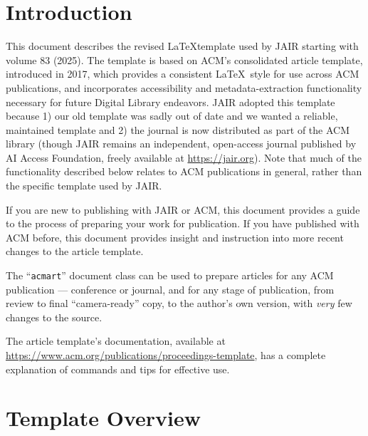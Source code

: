 \documentclass[manuscript, screen, review]{jair}
\begin{document}



\maketitle

\section{Introduction}
This document describes the revised \LaTeX template used by JAIR starting with volume 83 (2025). The template is based on ACM's consolidated article template, introduced in 2017, which provides a
consistent \LaTeX\ style for use across ACM publications, and
incorporates accessibility and metadata-extraction functionality
necessary for future Digital Library endeavors. JAIR adopted this template because 1) our old template was sadly out of date and we wanted a reliable, maintained template and 2) the journal is now distributed as part of the ACM library (though JAIR remains an independent, open-access journal published by AI Access Foundation, freely available at \url{https://jair.org}). Note that much of the functionality described below relates to ACM publications in general, rather than the specific template used by JAIR.

If you are new to publishing with JAIR or ACM, this document provides a
guide to the process of preparing your work for publication. If you
have published with ACM before, this document provides insight and
instruction into more recent changes to the article template.

The ``\verb|acmart|'' document class can be used to prepare articles
for any ACM publication --- conference or journal, and for any stage
of publication, from review to final ``camera-ready'' copy, to the
author's own version, with {\itshape very} few changes to the source.

The article template's documentation, available at
\url{https://www.acm.org/publications/proceedings-template}, has a
complete explanation of commands and tips for effective
use.

\section{Template Overview}
\end{document}
